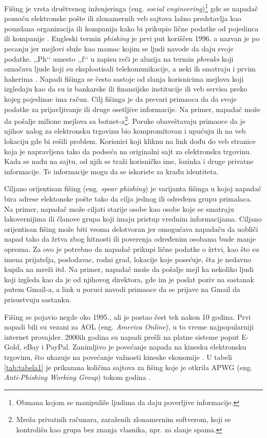\documentclass[a4paper]{article}
\begin{document}
{Fišing je vrsta društvenog inženjeringa (eng. {\em social engineering})\footnote{Obmana kojom se manipuliše ljudima da daju poverljive informacije.} gde se napadač pomoću elektronske pošte ili zlonamernih veb sajtova lažno predstavlja kao pouzdana organizacija ili kompanija kako bi prikupio lične podatke od pojedinca ili kompanije \cite{phishing_us_cert}. Engleski termin {\em  phishing} je prvi put koriščen 1996. a nazvan je po pecanju jer mejlovi služe kao mamac kojim se ljudi navode da daju svoje podatke. ,,Ph‘‘ umesto ,,f‘‘ u zapisu reči je aluzija na termin {\em phreaks} koji označava ljude koji su eksploatisali telekomunikacije, a neki ih smatraju i prvim hakerima \cite{phishing_org}.
Napadi fišinga se često sastoje od slanja korisnicima mejlova koji izgledaju kao da su iz bankarske ili finansijske institucije ili veb servisa preko kojeg pojedinac ima račun. Cilj fišinga je da prevari primaoca da da svoje podatke za prijavljivanje ili druge osetljive informacije. 
Na primer, napadač može da pošalje milione mejlova sa botnet-a\footnote{Mreža privatnih računara, zaraženih zlonamernim softverom, koji se kontrolišu kao grupa bez znanja vlasnika, npr. za slanje spama.}. Poruke obaveštavaju primaoce da je njihov nalog za elektronsku trgovinu bio kompromitovan i upućuju ih na veb lokaciju gde bi rešili problem. Korisnici koji kliknu na link dođu do veb stranice koja je napravljena tako da podseća na originalni sajt za elektronsku trgovinu. Kada se nađu na sajtu, od njih se traži korisničko ime, lozinka i druge privatne informacije. Te informacije mogu da se iskoriste za krađu identiteta.

Ciljano orijentisan fišing (eng. {\em spear phishing}) je varijanta fišinga u kojoj napadač bira adrese elektonske pošte tako da cilja jednog ili određenu grupu primalaca. Na primer, napadač može ciljati starije osobe kao osobe koje se smatraju lakovernijima ili članove grupa koji imaju pristup vrednim informacijama. Ciljano orijentisan fišing može biti veoma delotvoran jer omogućava napadaču da uobliči napad tako da žrtva zbog hitnosti ili poverenja određenim osobama bude manje oprezna. Za ovo je potrebno da napadač prikupi lične podatke o žrtvi, kao što su imena prijatelja, poslodavac, rodni grad, lokacije koje posećuje, šta je nedavno kupila na mreži itd.
Na primer, napadač može da pošalje mejl ka nekoliko ljudi koji izgleda kao da je od njihovog direktora, gde im je poslat poziv na sastanak putem Gmail-a, a link u poruci navodi primaoce da se prijave na Gmail da prisustvuju sastanku. 

Fišing se pojavio negde oko 1995., ali je postao čest tek nakon 10 godina. Prvi napadi bili su vezani za AOL (eng. {\em America Online}), u to vreme najpopularniji internet provajder\cite {phishing_aol}. 2000ih godina su napadi prešli na platne sisteme poput E-Gold, eBay i PayPal.
Zanimljivo je povećanje napada na kinesku elektronsku trgovinu, što ukazuje na povećanje važnosti kineske ekonomije \cite{knjiga}.
U tabeli \ref{tab:tabela1} je prikazana količina sajtova za fišing koje je otkrila APWG (eng. {\em Anti-Phishing Working Group}) tokom godina \cite{apwg}.

}
\end{document}
